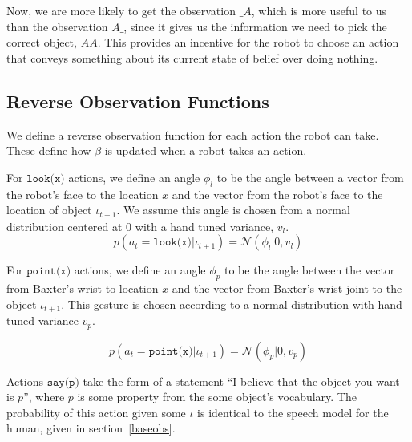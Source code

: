 \documentclass{article}
\begin{document}
Now, we are more likely to get the observation $\_A$, which is more useful to us than the observation $A\_$, since it gives us the information we need to pick the correct object, $AA$. This provides an incentive for the robot to choose an action that conveys something about its current state of belief over doing nothing. 

\subsection{Reverse Observation Functions}

We define a reverse observation function for each action the robot can take. These define how $\beta$ is updated when a robot takes an action. 

For $\texttt{look(x)}$ actions, we define an angle $\phi_l$ to be the angle between a vector from the robot's face to the location $x$ and the vector from the robot's face to the location of object $\iota_{t+1}$. We assume this angle is chosen from a normal distribution centered at 0 with a hand tuned variance, $v_l$. 
$$p(a_{t} = \texttt{look(x)} | \iota_{t+1}) = \mathcal{N}(\phi_l | 0, v_{l})$$

For $\texttt{point(x)}$ actions, we define an angle $\phi_p$ to be the angle between the vector from Baxter's wrist to location $x$ and the vector from Baxter's wrist joint to the object $\iota_{t+1}$. This gesture is chosen according to a normal distribution with hand-tuned variance $v_p$. 

$$p(a_{t} = \texttt{point(x)} | \iota_{t+1}) = \mathcal{N}(\phi_p | 0, v_{p})$$

Actions $\texttt{say(p)}$ take the form of a statement ``I believe that the object you want is $p$'', where $p$ is some property from the some object's vocabulary. The probability of this action given some $\iota$ is identical to the speech model for the human, given in section~\ref{baseobs}. 

\newpage


\end{document}
